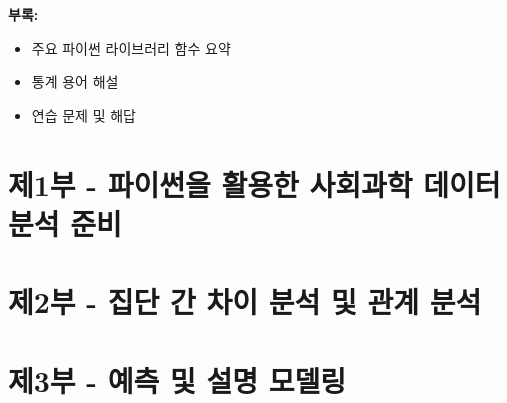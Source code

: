 \documentclass[
  letterpaper,
]{book}
\providecommand{\tightlist}{%
  \setlength{\itemsep}{0pt}\setlength{\parskip}{0pt}}
\begin{document}
\textbf{부록:}

\begin{itemize}
\tightlist
\item
  주요 파이썬 라이브러리 함수 요약
\item
  통계 용어 해설
\item
  연습 문제 및 해답
\end{itemize}

\part{제1부 - 파이썬을 활용한 사회과학 데이터 분석 준비}

\chapter{}\label{section}

\chapter{}\label{section-1}

\part{제2부 - 집단 간 차이 분석 및 관계 분석}

\chapter{}\label{section-2}

\chapter{}\label{section-3}

\chapter{}\label{section-4}

\part{제3부 - 예측 및 설명 모델링}

\chapter{}\label{section-5}

\chapter{}\label{section-6}
\end{document}
